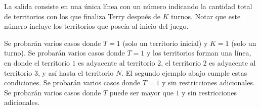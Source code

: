\documentclass{oci}
\begin{document}
\begin{outputDescription}
  La salida consiste en una única línea con un número indicando la cantidad total
  de territorios con los que finaliza Terry después de $K$ turnos.
  Notar que este número incluye los territorios que poseía al inicio del juego.
\end{outputDescription}

\begin{scoreDescription}
   Se probarán varios casos donde $T=1$ (solo un territorio inicial) y
  $K=1$ (solo un turno).
   Se probarán varios casos donde $T=1$ y los territorios forman una
  línea, en donde el territorio $1$ es adyacente al territorio $2$, el
  territorio $2$ es adyacente al territorio $3$, y así hasta el territorio $N$.
  El segundo ejemplo abajo cumple estas condiciones.
   Se probarán varios casos donde $T=1$ y sin
  restricciones adicionales.
   Se probarán varios casos donde $T$ puede ser mayor que $1$ y sin restricciones
  adicionales.
\end{scoreDescription}

\begin{sampleDescription}
\end{sampleDescription}
\end{document}
